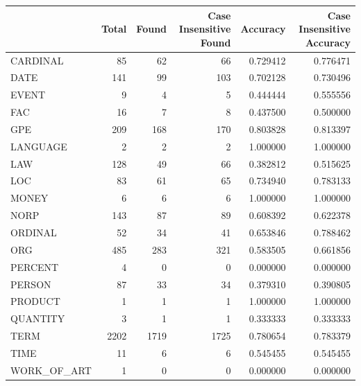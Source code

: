 \begin{tabular}{lrrrrr}
\toprule
 & Total & Found & Case Insensitive Found & Accuracy & Case Insensitive Accuracy \\
\midrule
CARDINAL & 85 & 62 & 66 & 0.729412 & 0.776471 \\
DATE & 141 & 99 & 103 & 0.702128 & 0.730496 \\
EVENT & 9 & 4 & 5 & 0.444444 & 0.555556 \\
FAC & 16 & 7 & 8 & 0.437500 & 0.500000 \\
GPE & 209 & 168 & 170 & 0.803828 & 0.813397 \\
LANGUAGE & 2 & 2 & 2 & 1.000000 & 1.000000 \\
LAW & 128 & 49 & 66 & 0.382812 & 0.515625 \\
LOC & 83 & 61 & 65 & 0.734940 & 0.783133 \\
MONEY & 6 & 6 & 6 & 1.000000 & 1.000000 \\
NORP & 143 & 87 & 89 & 0.608392 & 0.622378 \\
ORDINAL & 52 & 34 & 41 & 0.653846 & 0.788462 \\
ORG & 485 & 283 & 321 & 0.583505 & 0.661856 \\
PERCENT & 4 & 0 & 0 & 0.000000 & 0.000000 \\
PERSON & 87 & 33 & 34 & 0.379310 & 0.390805 \\
PRODUCT & 1 & 1 & 1 & 1.000000 & 1.000000 \\
QUANTITY & 3 & 1 & 1 & 0.333333 & 0.333333 \\
TERM & 2202 & 1719 & 1725 & 0.780654 & 0.783379 \\
TIME & 11 & 6 & 6 & 0.545455 & 0.545455 \\
WORK_OF_ART & 1 & 0 & 0 & 0.000000 & 0.000000 \\
\bottomrule
\end{tabular}
